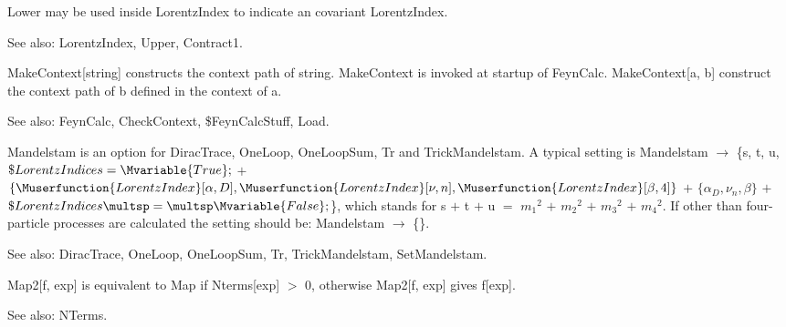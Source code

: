 \dispSFoutmath{
{{\beta }^*}
}



Lower may be used inside LorentzIndex to indicate an covariant LorentzIndex.

See also:  LorentzIndex, Upper, Contract1.



MakeContext[string] constructs the context path of string. MakeContext is invoked at startup of FeynCalc. MakeContext[a, b] construct the
  context path of b defined in the context of a.

See also:  FeynCalc, CheckContext, \${}FeynCalcStuff, Load.



Mandelstam is an option for DiracTrace, OneLoop, OneLoopSum, Tr and TrickMandelstam. { }A typical setting is Mandelstam \(\rightarrow \)
  \{s, t, u, \(\$LorentzIndices=\Mvariable{True};\) \(+\) \(\{\Muserfunction{LorentzIndex}[\alpha ,D],\Muserfunction{LorentzIndex}[\nu ,n],\Muserfunction{LorentzIndex}[\beta
,4]\}\) \(+\) \(\{{{\alpha }_D},{{\nu }_n},\beta \}\) \(+\) \(\$LorentzIndices\multsp =\multsp \Mvariable{False};\)\}, which stands for { }s \(+\)
t \(+\) u \(=\) \({{{m_1}}^2}\) \(+\) \({{{m_2}}^2}\) \(+\) \({{{m_3}}^2}\) \(+\) \({{{m_4}}^2}\). If other than four-particle processes are calculated
the setting should be: Mandelstam \(\rightarrow \) \{\}.

See also:  DiracTrace, OneLoop, OneLoopSum, Tr, TrickMandelstam, SetMandelstam.



Map2[f, exp] is equivalent to Map if Nterms[exp] \(>\) 0, otherwise Map2[f, exp] gives f[exp].

See also:  NTerms.








